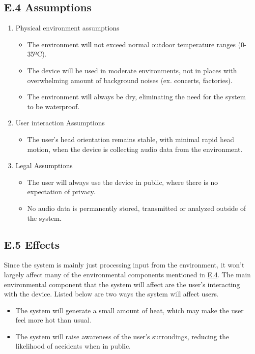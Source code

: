 \documentclass[12pt]{article}
\theoremstyle{definition}
\begin{document}
\subsection{E.4 Assumptions} \label{item: E.4}

\begin{enumerate}
  \item Physical environment assumptions
  \begin{itemize}
    \item The environment will not exceed normal outdoor temperature ranges
    (0-35ºC). 
    \item The device will be used in moderate environments, not in places with
    overwhelming amount of background noises (ex. concerts, factories).
    \item The environment will always be dry, eliminating the need for the
    system to be waterproof. 
  \end{itemize}

  \item User interaction Assumptions
  \begin{itemize}
    \item The user's head orientation remains stable, with minimal rapid head
    motion, when the device is collecting audio data from the environment. 
  \end{itemize}

  \item Legal Assumptions
  \begin{itemize}
    \item The user will always use the device in public, where there is no
    expectation of privacy. 
    \item No audio data is permanently stored, transmitted or analyzed outside
    of the system. 
  \end{itemize}
\end{enumerate}

\subsection{E.5 Effects}

Since the system is mainly just processing input from the environment, it won't
largely affect many of the environmental components mentioned in \hyperref[item:
E.4]{E.4}. The main environmental component that the system will affect are the
user's interacting with the device. Listed below are two ways the system will
affect users.

\begin{itemize}
  \item The system will generate a small amount of heat, which may make the user
  feel more hot than usual. 
  \item The system will raise awareness of the user's surroudings, reducing the
  likelihood of accidents when in public. 
\end{itemize}
\end{document}
